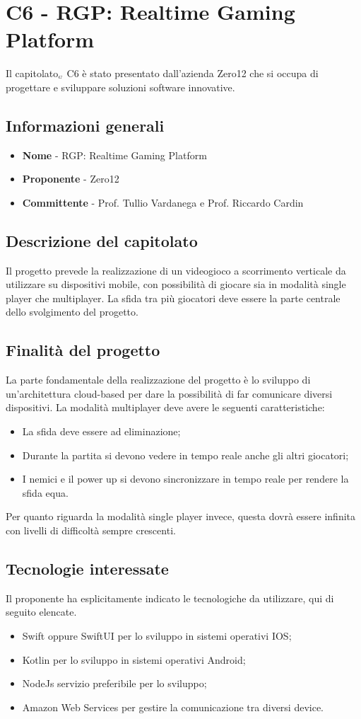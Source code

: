 \chapter{C6 - RGP: Realtime Gaming Platform} \label{CapitolatoC6}
Il capitolato$_{\scaleto{G}{3pt}}$ C6 è stato presentato dall'azienda Zero12 che si occupa di progettare e sviluppare soluzioni software innovative. 
\section{Informazioni generali} \label{C6InformazioniGenerali}
\begin{itemize}
	\item \textbf{Nome} - RGP: Realtime Gaming Platform
	\item \textbf{Proponente} - Zero12
	\item \textbf{Committente} - Prof. Tullio Vardanega e Prof. Riccardo Cardin
\end{itemize}
\section{Descrizione del capitolato} \label{C6DescrizioneDelCapitolato}
Il progetto prevede la realizzazione di un videogioco a scorrimento verticale da utilizzare su dispositivi mobile, con possibilità di giocare sia in modalità single player che multiplayer. La sfida tra più giocatori deve essere la parte centrale dello svolgimento del progetto.
\section{Finalità del progetto} \label{C6FinalitàDelProgetto}
La parte fondamentale della realizzazione del progetto è lo sviluppo di un'architettura cloud-based  per dare la possibilità di far comunicare diversi dispositivi. La modalità multiplayer deve avere le seguenti caratteristiche:
\begin{itemize}
	\item La sfida deve essere ad eliminazione;
	\item Durante la partita si devono vedere in tempo reale anche gli altri giocatori;
	\item I nemici e il power up si devono sincronizzare in tempo reale per rendere la sfida equa.
\end{itemize}
Per quanto riguarda la modalità single player invece, questa dovrà essere infinita con livelli di difficoltà sempre crescenti.
\section{Tecnologie interessate} \label{C6TecnologieInteressate}
Il proponente ha esplicitamente indicato le tecnologiche da utilizzare, qui di seguito elencate.
\begin{itemize}
	\item Swift oppure SwiftUI per lo sviluppo in sistemi operativi IOS;
	\item Kotlin per lo sviluppo in sistemi operativi Android;
	\item NodeJs servizio preferibile per lo sviluppo;
	\item Amazon Web Services per gestire la comunicazione tra diversi device.
\end{itemize}

